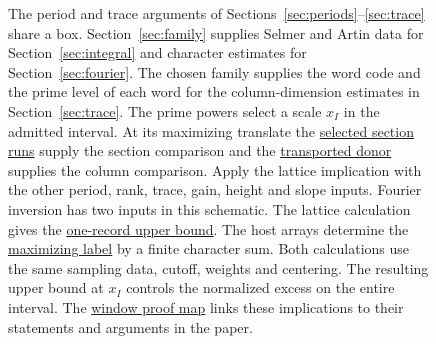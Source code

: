 \begin{figure}[!htbp]
\caption[From theta periods to zero exclusion]{The period and trace arguments of
  Sections~\ref{sec:periods}--\ref{sec:trace} share a box.
  Section~\ref{sec:family} supplies Selmer and Artin data for
  Section~\ref{sec:integral} and character estimates for Section~\ref{sec:fourier}.
  The chosen family supplies the word code and the prime level of each word
  for the column-dimension estimates in Section~\ref{sec:trace}.
  The prime powers select a scale \(x_I\) in the admitted interval.
  At its maximizing translate the
  \hyperlink{proof.section-run-family-identification}{selected section runs}
  supply the section comparison and the
  \hyperlink{proof.ramified-donor-identification}{transported donor}
  supplies the column comparison. Apply the lattice implication with
  the other period, rank, trace, gain, height and slope inputs.
  Fourier inversion has two inputs in this schematic. The lattice
  calculation gives the \hyperlink{proof.classical-selected-excess}{one-record
  upper bound}. The host arrays determine the
  \hyperlink{proof.classical-maximizing-translate}{maximizing label} by a finite
  character sum. Both calculations use the same sampling data, cutoff, weights
  and centering. The resulting upper bound at \(x_I\) controls the
  normalized excess on the entire interval.
  The \href{proof-map.html\#window}{window proof map} links these
  implications to their statements and arguments in the paper.}
\label{fig:overview}
\end{figure}
